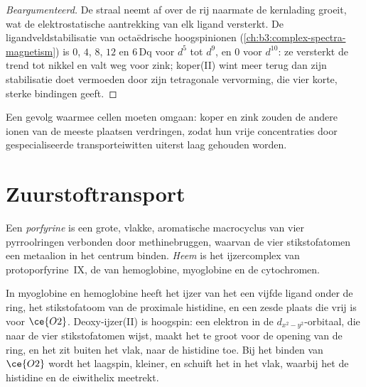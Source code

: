 \begin{proof}[Beargumenteerd]
De straal neemt af over de rij naarmate de kernlading groeit, wat de
elektrostatische aantrekking van elk ligand versterkt. De
ligandveldstabilisatie van octaëdrische hoogspinionen
(\cref{ch:b3:complex-spectra-magnetism}) is $0$, $4$,
$8$, $12$ en $6\,\mathrm{Dq}$ voor $d^5$ tot $d^9$, en $0$ voor $d^{10}$: ze versterkt de trend tot nikkel en
valt weg voor zink; koper(II) wint meer terug dan zijn stabilisatie doet
vermoeden door zijn tetragonale vervorming, die vier korte, sterke
bindingen geeft.
\end{proof}

Een gevolg waarmee cellen moeten omgaan: koper en zink zouden de andere
ionen van de meeste plaatsen verdringen, zodat hun vrije concentraties
door gespecialiseerde transporteiwitten uiterst laag gehouden worden.

\section{Zuurstoftransport}

\begin{definition}\label{def:b3:bioinorganic:haem}
Een \emph{porfyrine} is een grote, vlakke, aromatische
macrocyclus van vier pyrroolringen verbonden door methinebruggen, waarvan
de vier stikstofatomen een metaalion in het centrum binden.
\emph{Heem} is het ijzercomplex van protoporfyrine~IX, de
 van hemoglobine, myoglobine en de cytochromen.
\end{definition}

In myoglobine en hemoglobine heeft het ijzer van het  een vijfde
ligand onder de ring, het stikstofatoom van de proximale histidine, en een
zesde plaats die vrij is voor $\ce{O2}$.
Deoxy-ijzer(II) is hoogspin: een elektron in de $d_{x^2-y^2}$-orbitaal, die naar de vier
stikstofatomen wijst, maakt het te groot voor de opening van de ring, en
het zit buiten het vlak, naar de histidine toe. Bij het binden van $\ce{O2}$ wordt het laagspin, kleiner, en
schuift het in het vlak, waarbij het de histidine en de eiwithelix
meetrekt.

